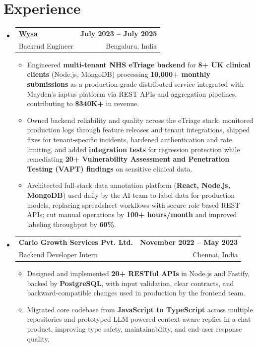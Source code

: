 \documentclass[letterpaper,10pt]{article}
\makeatletter
\newcommand{\resumeItem}[1]{
  \item\small{#1\vspace{-1pt}}
}
\newcommand{\resumeSubheading}[4]{
  \vspace{1pt}\item
    \begin{tabular*}{0.985\textwidth}[t]{l@{\extracolsep{\fill}}r}
      \textbf{#1} & \textbf{\small #2} \\
      {\small\color{ResumeSlate} #3} & {\small\color{ResumeSlate} #4} \\
    \end{tabular*}\vspace{-6pt}
}
\newcommand{\resumeSubHeadingListStart}{\begin{itemize}[leftmargin=0.0in, label={}, itemsep=2pt, topsep=2pt]}
\newcommand{\resumeSubHeadingListEnd}{\end{itemize}}
\newcommand{\resumeItemListStart}{\begin{itemize}[leftmargin=0.18in, itemsep=2pt, topsep=1pt]}
\newcommand{\resumeItemListEnd}{\end{itemize}\vspace{-4pt}}
\makeatother
\begin{document}
\section{Experience}
\resumeSubHeadingListStart
  \resumeSubheading
    {\href{https://www.wysa.io}{Wysa}}{July 2023 -- July 2025}
    {Backend Engineer}{Bengaluru, India}
    \resumeItemListStart
      \resumeItem{Engineered \textbf{multi-tenant NHS eTriage backend} for \textbf{8+ UK clinical clients} (Node.js, MongoDB) processing \textbf{10{,}000+ monthly submissions} as a production-grade distributed service integrated with Mayden's iaptus platform via REST APIs and aggregation pipelines, contributing to \textbf{\$340K+} in revenue.}
      \resumeItem{Owned backend reliability and quality across the eTriage stack: monitored production logs through feature releases and tenant integrations, shipped fixes for tenant-specific incidents, hardened authentication and rate limiting, and added \textbf{integration tests} for regression protection while remediating \textbf{20+ Vulnerability Assessment and Penetration Testing (VAPT) findings} on sensitive clinical data.}
      \resumeItem{Architected full-stack data annotation platform (\textbf{React, Node.js, MongoDB}) used daily by the AI team to label data for production models, replacing spreadsheet workflows with secure role-based REST APIs; cut manual operations by \textbf{100+ hours/month} and improved labeling throughput by \textbf{60\%}.}
    \resumeItemListEnd
  \resumeSubheading
    {Cario Growth Services Pvt. Ltd.}{November 2022 -- May 2023}
    {Backend Developer Intern}{Chennai, India}
    \resumeItemListStart
      \resumeItem{Designed and implemented \textbf{20+ RESTful APIs} in Node.js and Fastify, backed by \textbf{PostgreSQL}, with input validation, clear contracts, and backward-compatible changes used in production by the frontend team.}
      \resumeItem{Migrated core codebase from \textbf{JavaScript to TypeScript} across multiple repositories and prototyped LLM-powered context-aware replies in a chat product, improving type safety, maintainability, and end-user response quality.}
    \resumeItemListEnd
\resumeSubHeadingListEnd
\vspace{-4pt}
\end{document}
